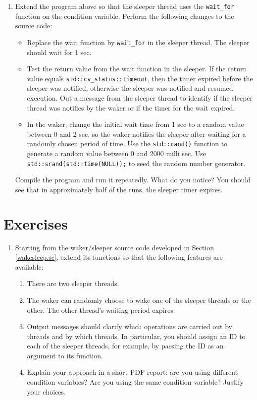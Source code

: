 \documentclass[12pt]{book}
\begin{document}
\begin{enumerate}[resume*]  
\item Extend the program above so that the sleeper thread uses the \lstinline$wait_for$ function on the condition variable. Perform the following changes to the source code:
  \begin{itemize}[label=--]
  \item Replace the wait function by \lstinline$wait_for$ in the sleeper thread. The sleeper should wait for 1 sec.
    
  \item Test the return value from the wait function in the sleeper. If the return value equals \lstinline$std::cv_status::timeout$, then the timer expired before the sleeper was notified, otherwise the sleeper was notified and resumed execution. Out a message from the sleeper thread to identify if the sleeper thread was notifies by the waker or if the timer for the wait expired.

  \item In the waker, change the initial wait time from 1 sec to a random value between 0 and 2 sec, so the waker notifies the sleeper after waiting for a randomly chosen period of time. Use the \lstinline$std::rand()$ function to generate a random value between 0 and 2000 milli sec. Use \lstinline$std::srand(std::time(NULL));$ to seed the random number generator.
  \end{itemize}

  Compile the program and run it repeatedly. What do you notice? You should see that in approximately half of the runs, the sleeper timer expires. 
  
\end{enumerate}

\section{Exercises}

\begin{enumerate}
\item Starting from the waker/sleeper source code developed in Section \ref{wakesleep.se}, extend its functions so that the following features are available:
  \begin{enumerate}[label=\alph*)]
  \item There are two sleeper threads.
  \item The waker can randomly choose to wake one of the sleeper threads or the other. The other thread's waiting period expires.
  \item Output messages should clarify which operations are carried out by threads and by which threads. In particular, you should assign an ID to each of the sleeper threads, for example, by passing the ID as an argument to its function.
    \item Explain your approach in a short PDF report: are you using different condition variables? Are you using the same condition variable? Justify your choices. 
  \end{enumerate}
\end{enumerate}
\end{document}
